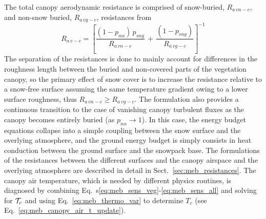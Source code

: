 The total canopy aerodynamic resistance is comprised 
of snow-buried, $R_{a\,vn-c}$, and non-snow buried, $R_{a\,vg-c}$, 
resistances from
%
\begin{equation}
\label{eq:meb_resis}
R_{a\,v-c} = 
{\left[
{\frac{\left(1-p_{n\alpha}\right)\,p_{sng}}{R_{a\,vn-c}}}
\,+\, 
{\frac{\left(1-p_{sng}\right)}{R_{a\,vg-c}}} 
\right]}^{-1}
%
\end{equation}
%
%
The separation of the resistances is done to mainly account for differences
in the roughness length between the buried and non-covered parts of
the vegetation canopy, so
the primary effect of snow cover is to increase the resistance
relative to a snow-free surface assuming the same temperature gradient
owing to a lower surface roughness, thus $R_{a\,vn-c} \geq R_{a\,vg-c}$.
%
The formulation also provides a continuous
transition to the case of vanishing canopy turbulent fluxes 
as the canopy becomes entirely buried
(as $p_{n\alpha}\rightarrow 1$).
%
In this case,
the energy budget 
equations collapse into a simple coupling
between the snow surface and the overlying atmosphere, and
the ground energy budget is simply consists in
heat conduction between the ground surface and the snowpack base.
%
%
%
%
%
%
The formulations of the resistances between the different surfaces and
the canopy airspace and the overlying atmosphere are 
described in detail in 
Sect.~\ref{sec:meb_resistances}.
%
The canopy air temperature, which is needed by different physics
routines, 
is diagnosed
by combining Eq.~s\ref{eq:meb_sens_veg}-\ref{eq:meb_sens_all}
and solving for ${\cal T}_c$ and using
Eq.~\ref{eq:meb_thermo_var} to determine $T_c$
(see Eq.~\ref{eq:meb_canopy_air_t_update}).
%
%
%
%

